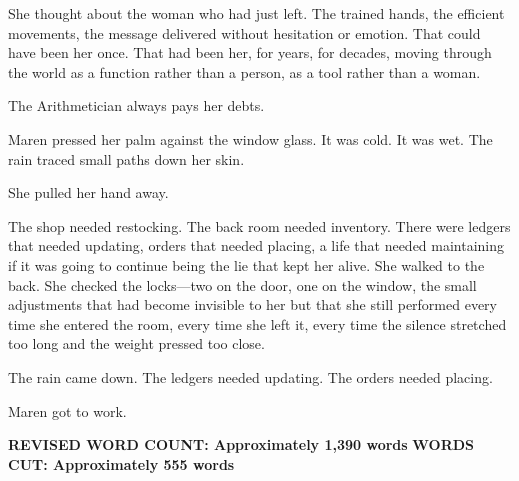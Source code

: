 \documentclass[12pt,letterpaper,openany]{book}
\begin{document}
\par
She thought about the woman who had just left. The trained hands, the efficient movements, the message delivered without hesitation or emotion. That could have been her once. That had been her, for years, for decades, moving through the world as a function rather than a person, as a tool rather than a woman.
\par
The Arithmetician always pays her debts.
\par
Maren pressed her palm against the window glass. It was cold. It was wet. The rain traced small paths down her skin.
\par
She pulled her hand away.
\par
The shop needed restocking. The back room needed inventory. There were ledgers that needed updating, orders that needed placing, a life that needed maintaining if it was going to continue being the lie that kept her alive. She walked to the back. She checked the locks—two on the door, one on the window, the small adjustments that had become invisible to her but that she still performed every time she entered the room, every time she left it, every time the silence stretched too long and the weight pressed too close.
\par
The rain came down. The ledgers needed updating. The orders needed placing.
\par
Maren got to work.
\par
\hrulefill\textbf{REVISED WORD COUNT: Approximately 1,390 words} \textbf{WORDS CUT: Approximately 555 words}
\par
\end{document}
